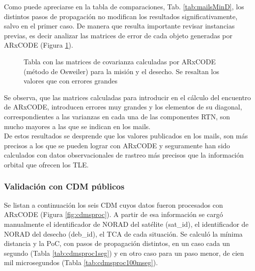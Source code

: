Como puede apreciarse en la tabla de comparaciones, Tab. \ref{tab:mailsMinD}, los distintos pasos de propagaci\'on no modifican los resultados significativamente, salvo en el primer caso. De manera que resulta importante revisar instancias previas, es decir analizar las matrices de error de cada objeto generadas por ARxCODE (Figura \ref{fig:tablaMAmails}).\\

 \begin{figure}[!h]
  \centering
  \caption{Tabla con las matrices de covarianza calculadas por ARxCODE (m\'etodo de Osweiler) para la misi\'on y el desecho. Se resaltan los valores que con errores grandes}
  \label{fig:tablaMAmails}
\end{figure}

Se observa, que las matrices calculadas para introducir en el c\'alculo del encuentro de ARxCODE, introducen errores muy grandes y los elementos de su diagonal, correspondientes a las varianzas en cada una de las componentes RTN, son mucho mayores a las que se indican en los mails.\\
De estos resultados se desprende que los valores publicados en los mails, son m\'as precisos a los que se pueden lograr con ARxCODE y seguramente han sido calculados con datos observacionales de rastreo m\'as precisos que la informaci\'on orbital que ofrecen los TLE. 

\subsubsection*{Validaci\'on con CDM p\'ublicos}

Se listan a continuaci\'on los seis CDM cuyos datos fueron procesados con ARxCODE (Figura \ref{fig:cdmsproc}). A partir de esa informaci\'on se carg\'o manualmente el identificador de NORAD del sat\'elite (sat\_id), el identificador de NORAD del desecho (deb\_id), el TCA de cada situaci\'on. Se calcul\'o la m\'inima distancia y la PoC, con pasos de propagaci\'on distintos, en un caso cada un segundo (Tabla \ref{tab:cdmsproc1seg}) y en otro caso para un paso menor, de cien mil microsegundos (Tabla \ref{tab:cdmsproc100mseg}).\\
 
